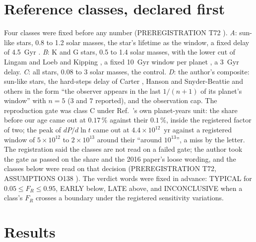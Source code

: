\documentclass[pre,twocolumn,superscriptaddress,nofootinbib]{revtex4-2}
\begin{document}
\section{Reference classes, declared first}

Four classes were fixed before any number (PREREGISTRATION T72 \cite{repo}). \emph{A}: sun-like stars, 0.8 to 1.2
solar masses, the star's lifetime as the window, a fixed delay of 4.5~Gyr \cite{HKW18}. \emph{B}: K and G stars,
0.5 to 1.4 solar masses, with the lower cut of Lingam and Loeb \cite{LL18} and Kipping \cite{Kipping25}, a fixed
10~Gyr window per planet \cite{Kipping25}, a 3~Gyr delay. \emph{C}: all stars, 0.08 to 3 solar masses, the control.
\emph{D}: the author's composite: sun-like stars, the hard-steps delay of Carter \cite{Carter83}, Hanson
\cite{Hanson98} and Snyder-Beattie and others \cite{SB21} in the form ``the observer appears in the last $1/(n+1)$ of
its planet's window'' with $n = 5$ ($3$ and $7$ reported), and the observation cap. The reproduction gate was class C
under Ref.~\cite{LBS16}'s own planet-years unit: the share before our age came out at $0.17\,\%$ against their
$0.1\,\%$, inside the registered factor of two; the peak of $dP/d\ln t$ came out at $4.4 \times 10^{12}$~yr against a
registered window of $5 \times 10^{12}$ to $2 \times 10^{13}$ around their ``around $10^{13}$'', a miss by the letter.
The registration said the classes are not read on a failed gate; the author took the gate as passed on the share and
the 2016 paper's loose wording, and the classes below were read on that decision (PREREGISTRATION T72, ASSUMPTIONS
O138 \cite{repo}). The verdict words were fixed in advance: TYPICAL for $0.05 \le F_R \le 0.95$, EARLY below, LATE
above, and INCONCLUSIVE when a class's $F_R$ crosses a boundary under the registered sensitivity variations.

\section{Results}
\end{document}
